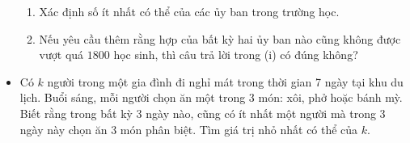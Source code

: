 \documentclass[11pt]{scrartcl}
\begin{document}
\begin{itemize}[label=, leftmargin=0em, itemsep=-0em]
\begin{btvn}
        \begin{enumerate}
            \item Xác định số ít nhất có thể của các ủy ban trong trường học.
            \item Nếu yêu cầu thêm rằng hợp của bất kỳ hai ủy ban nào cũng không được vượt quá $1800$ học sinh, thì câu trả lời trong (i) có đúng không?
        \end{enumerate}
    \end{btvn}
    \item \begin{btvn} Có $k$ người trong một gia đình đi nghỉ mát trong thời gian 7 ngày tại khu du lịch. Buổi sáng, mỗi người chọn ăn một trong 3 món: xôi, phở hoặc bánh mỳ. Biết rằng trong bất kỳ 3 ngày nào, cũng có ít nhất một người mà trong 3 ngày này chọn ăn 3 món phân biệt. Tìm giá trị nhỏ nhất có thể của $k$.
        

\end{btvn}
\end{itemize}
\end{document}
